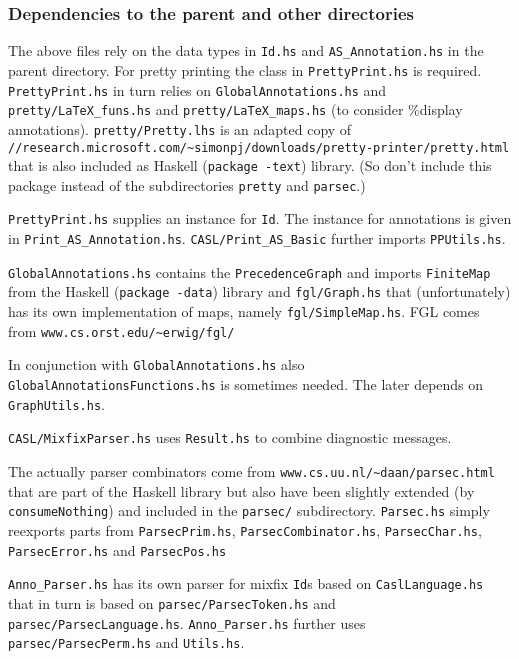 \documentclass{article}
\begin{document}
\subsubsection*{Dependencies to the parent and other directories}
\label{sec:casl}

The above files rely on the data types in \texttt{Id.hs} and
\texttt{AS\_Annotation.hs} in the parent directory. For pretty
printing the class in \texttt{PrettyPrint.hs} is required.
\texttt{PrettyPrint.hs} in turn relies on
\texttt{GlobalAnnotations.hs} and \texttt{pretty/LaTeX\_funs.hs} and
\texttt{pretty/LaTeX\_maps.hs} (to consider \%display annotations).
\texttt{pretty/Pretty.lhs} is an adapted copy of\\
\texttt{//research.microsoft.com/\~{}simonpj/downloads/pretty-printer/pretty.html}
that is also included as Haskell (\texttt{package -text}) library. (So
don't include this package instead of the subdirectories
\texttt{pretty} and \texttt{parsec}.)

\texttt{PrettyPrint.hs} supplies an instance for \texttt{Id}. The
instance for annotations is given in \texttt{Print\_AS\_Annotation.hs}.
\texttt{CASL/Print\_AS\_Basic} further imports \texttt{PPUtils.hs}.

\texttt{GlobalAnnotations.hs} contains the \texttt{PrecedenceGraph} and
imports \texttt{FiniteMap} from the Haskell (\texttt{package -data})
library and \texttt{fgl/Graph.hs} that (unfortunately) has its
own implementation of maps, namely
\texttt{fgl/SimpleMap.hs}. 
FGL comes from \texttt{www.cs.orst.edu/\~{}erwig/fgl/}

In conjunction with \texttt{GlobalAnnotations.hs} also
\texttt{GlobalAnnotationsFunctions.hs} is sometimes needed. The later
depends on \texttt{GraphUtils.hs}. 

\texttt{CASL/MixfixParser.hs} uses \texttt{Result.hs} to combine
diagnostic messages.

The actually parser combinators come from 
\texttt{www.cs.uu.nl/\~{}daan/parsec.html} that are part of the
Haskell library but also have been slightly extended (by
\texttt{consumeNothing}) and included in the \texttt{parsec/}
subdirectory. \texttt{Parsec.hs} simply reexports parts from
\texttt{ParsecPrim.hs}, \texttt{ParsecCombinator.hs},
\texttt{ParsecChar.hs}, \texttt{ParsecError.hs} and
\texttt{ParsecPos.hs}

\texttt{Anno\_Parser.hs} has its own parser for mixfix \texttt{Id}s based on
\texttt{CaslLanguage.hs} that in turn is based on
\texttt{parsec/ParsecToken.hs} and \texttt{parsec/ParsecLanguage.hs}.
\texttt{Anno\_Parser.hs} further uses \texttt{parsec/ParsecPerm.hs}
and \texttt{Utils.hs}.
\end{document}
